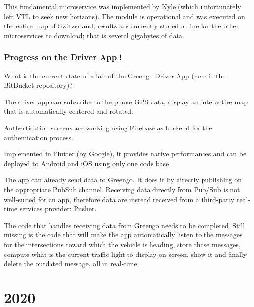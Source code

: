 \documentclass[letterpaper,10pt,english]{sphinxmanual}
\begin{document}
This fundamental microservice was implemented by Kyle (which unfortunately left VTL to seek new horizons). The module is operational and was executed on the entire map of Switzerland, results are currently stored online for the other microservices to download; that is several gigabytes of data.

\begin{figure}[htbp]
\centering

\noindent{}
\end{figure}


\subsubsection{Progress on the Driver App📱!}
\label{\detokenize{blog/2019/12/driver_app:progress-on-the-driver-app}}\label{\detokenize{blog/2019/12/driver_app::doc}}
\begin{figure}[htbp]
\centering

\noindent{}
\end{figure}

What is the current state of affair of the Greengo Driver App (here is the BitBucket repository)?

The driver app can subscribe to the phone GPS data, display an interactive map that is automatically centered and rotated.

Authentication screens are working using Firebase as backend for the authentication process.

Implemented in Flutter (by Google), it provides native performances and can be deployed to Android and iOS using only one code base.

The app can already send data to Greengo. It does it by directly publishing on the appropriate PubSub channel.
Receiving data directly from Pub/Sub is not well-suited for an app, therefore data are instead received from a third-party real-time services provider: Pusher.

The code that handles receiving data from Greengo needs to be completed. Still missing is the code that will make the app automatically listen to the messages for the intersections toward which the vehicle is heading, store those messages, compute what is the current traffic light to display on screen, show it and finally delete the outdated message, all in real-time.


\section{2020}
\label{\detokenize{blog/2020/index:id1}}\label{\detokenize{blog/2020/index::doc}}
\end{document}
